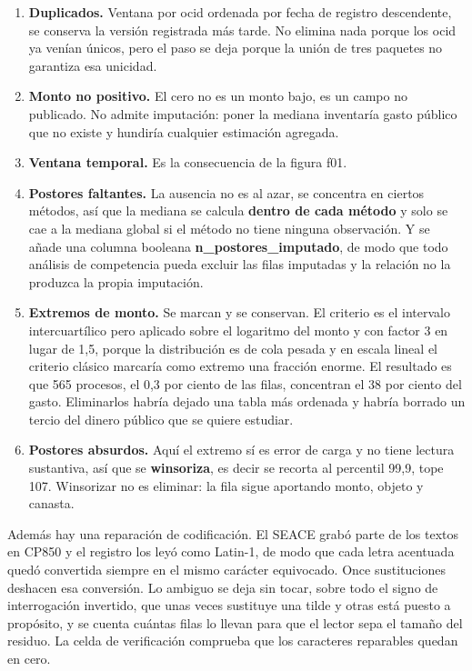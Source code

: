 \documentclass[11pt]{article}
\begin{document}
\begin{enumerate}
  \item \textbf{Duplicados.} Ventana por ocid ordenada por fecha de registro descendente, se conserva la versión registrada más tarde. No elimina nada porque los ocid ya venían únicos, pero el paso se deja porque la unión de tres paquetes no garantiza esa unicidad.
  \item \textbf{Monto no positivo.} El cero no es un monto bajo, es un campo no publicado. No admite imputación: poner la mediana inventaría gasto público que no existe y hundiría cualquier estimación agregada.
  \item \textbf{Ventana temporal.} Es la consecuencia de la figura f01.
  \item \textbf{Postores faltantes.} La ausencia no es al azar, se concentra en ciertos métodos, así que la mediana se calcula \textbf{dentro de cada método} y solo se cae a la mediana global si el método no tiene ninguna observación. Y se añade una columna booleana \textbf{n\_\allowbreak{}postores\_\allowbreak{}imputado}, de modo que todo análisis de competencia pueda excluir las filas imputadas y la relación no la produzca la propia imputación.
  \item \textbf{Extremos de monto.} Se marcan y se conservan. El criterio es el intervalo intercuartílico pero aplicado sobre el logaritmo del monto y con factor 3 en lugar de 1,5, porque la distribución es de cola pesada y en escala lineal el criterio clásico marcaría como extremo una fracción enorme. El resultado es que 565 procesos, el 0,3 por ciento de las filas, concentran el 38 por ciento del gasto. Eliminarlos habría dejado una tabla más ordenada y habría borrado un tercio del dinero público que se quiere estudiar.
  \item \textbf{Postores absurdos.} Aquí el extremo sí es error de carga y no tiene lectura sustantiva, así que se \textbf{winsoriza}, es decir se recorta al percentil 99,9, tope 107. Winsorizar no es eliminar: la fila sigue aportando monto, objeto y canasta.
\end{enumerate}
Además hay una reparación de codificación. El SEACE grabó parte de los textos en CP850 y el registro los leyó como Latin-1, de modo que cada letra acentuada quedó convertida siempre en el mismo carácter equivocado. Once sustituciones deshacen esa conversión. Lo ambiguo se deja sin tocar, sobre todo el signo de interrogación invertido, que unas veces sustituye una tilde y otras está puesto a propósito, y se cuenta cuántas filas lo llevan para que el lector sepa el tamaño del residuo. La celda de verificación comprueba que los caracteres reparables quedan en cero.
\end{document}

